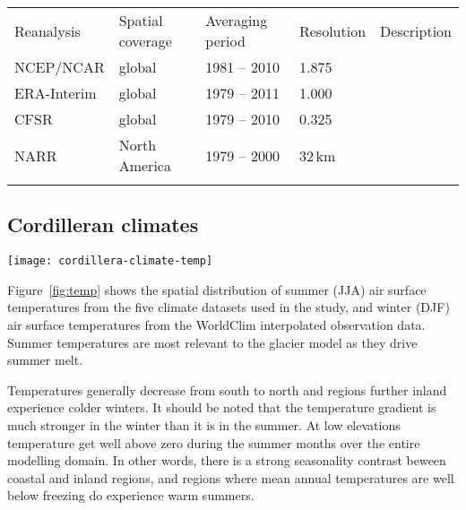 \begin{table*}[t]
	\caption{Characteristic of reanalysis climatologies used to force the ice sheet model.}
	\label{tab:reanalyses}
	\vskip4mm
	\centering
	\begin{tabular}{lllll}
		\tophline
		Reanalysis& Spatial coverage& Averaging period& Resolution& Description\\
		\middlehline
		NCEP/NCAR&  global&     1981 -- 2010& 1.875\degree& \citet{data:ncar}\\
		ERA-Interim&global&     1979 -- 2011& 1.000\degree& \citet{data:erai}\\
		CFSR&       global&     1979 -- 2010& 0.325\degree& \citet{data:cfsr}\\
		NARR&       North America& 1979 -- 2000& 32\,km& \citet{data:narr}\\
		\bottomhline
	\end{tabular}
\end{table*}


\subsection{Cordilleran climates}


\begin{figure*}[t]
	\vspace*{2mm}
	\begin{center}
		\texttt{[image: cordillera-climate-temp]}
	\end{center}
	\caption{Summer temperature maps from the five datasets used in this study and winter temperature map from the WorldClim dataset.}
	\label{fig:temp}
\end{figure*}

Figure~\ref{fig:temp} shows the spatial distribution of summer (JJA) air surface temperatures from the five climate datasets used in the study, and winter (DJF) air surface temperatures from the WorldClim interpolated observation data. Summer temperatures are most relevant to the glacier model as they drive summer melt.

Temperatures generally decrease from south to north and regions further inland experience colder winters. It should be noted that the temperature gradient is much stronger in the winter than it is in the summer. At low elevations temperature get well above zero during the summer months over the entire modelling domain. In other words, there is a strong seasonality contrast beween coastal and inland regions, and regions where mean annual temperatures are well below freezing do experience warm summers.

